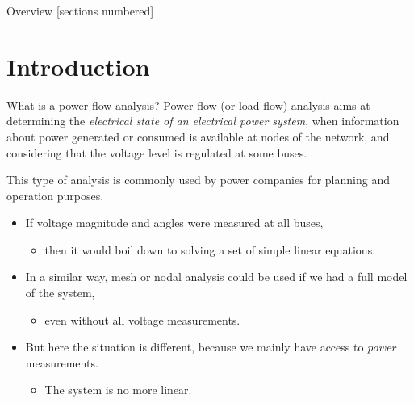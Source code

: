 \titleframe

\begin{frame}{Overview}
  [sections numbered]
  \tableofcontents[hideallsubsections]
\end{frame}

\section{Introduction}

\begin{frame}[allowframebreaks]{What is a power flow analysis?}
    Power flow (or load flow) analysis aims at determining the \textit{electrical state of an electrical power system}, when information about power generated or consumed is available at nodes of the network, and considering that the voltage level is regulated at some buses.
    
    This type of analysis is commonly used by power companies for planning and operation purposes.
    \begin{itemize}
        \item If voltage magnitude and angles were measured at all buses,
        \begin{itemize}
            \item then it would boil down to solving a set of simple linear equations.
        \end{itemize}
        \item In a similar way, mesh or nodal analysis could be used if we had a full model of the system,
        \begin{itemize}
            \item even without all voltage measurements.
        \end{itemize}
        \item But here the situation is different, because we mainly have access to \textit{power} measurements.
        \begin{itemize}
            \item The system is no more linear.
        \end{itemize}
    \end{itemize}
\end{frame}

